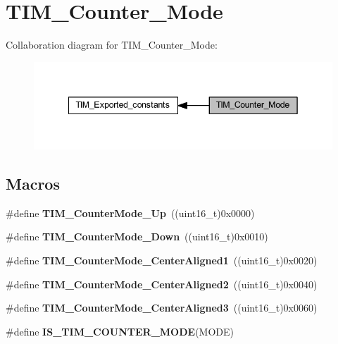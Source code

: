 \hypertarget{group___t_i_m___counter___mode}{}\section{T\+I\+M\+\_\+\+Counter\+\_\+\+Mode}
\label{group___t_i_m___counter___mode}
Collaboration diagram for T\+I\+M\+\_\+\+Counter\+\_\+\+Mode\+:
\nopagebreak
\begin{figure}[H]
\begin{center}
\leavevmode
\includegraphics[width=342pt]{group___t_i_m___counter___mode}
\end{center}
\end{figure}
\subsection*{Macros}
\begin{DoxyCompactItemize}
\item 
\mbox{\label{group___t_i_m___counter___mode_gaf4cd3ce74af3122507b77c8f6e79c832}} 
\#define {\bfseries T\+I\+M\+\_\+\+Counter\+Mode\+\_\+\+Up}~((uint16\+\_\+t)0x0000)
\item 
\mbox{\label{group___t_i_m___counter___mode_gadd7c4200d185bdcd9e64ae80e6b200b0}} 
\#define {\bfseries T\+I\+M\+\_\+\+Counter\+Mode\+\_\+\+Down}~((uint16\+\_\+t)0x0010)
\item 
\mbox{\label{group___t_i_m___counter___mode_gac07392e9637f8a0d115d4ba9a002ae93}} 
\#define {\bfseries T\+I\+M\+\_\+\+Counter\+Mode\+\_\+\+Center\+Aligned1}~((uint16\+\_\+t)0x0020)
\item 
\mbox{\label{group___t_i_m___counter___mode_ga3793122e4c123a99e46fc2f04acea0d4}} 
\#define {\bfseries T\+I\+M\+\_\+\+Counter\+Mode\+\_\+\+Center\+Aligned2}~((uint16\+\_\+t)0x0040)
\item 
\mbox{\label{group___t_i_m___counter___mode_ga65d9bc01ffa287cd7cf200d08c20a1ce}} 
\#define {\bfseries T\+I\+M\+\_\+\+Counter\+Mode\+\_\+\+Center\+Aligned3}~((uint16\+\_\+t)0x0060)
\item 
\#define {\bfseries I\+S\+\_\+\+T\+I\+M\+\_\+\+C\+O\+U\+N\+T\+E\+R\+\_\+\+M\+O\+DE}(M\+O\+DE)
\end{DoxyCompactItemize}


